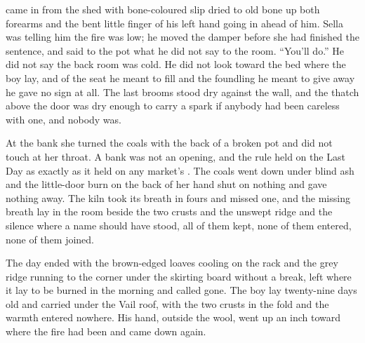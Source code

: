  came in from the shed with bone-coloured slip dried to old bone up both forearms and the bent little finger of his left hand going in ahead of him. Sella was telling him the fire was low; he moved the damper before she had finished the sentence, and said to the pot what he did not say to the room. “You'll do.” He did not say the back room was cold. He did not look toward the bed where the boy lay, and of the seat he meant to fill and the foundling he meant to give away he gave no sign at all. The last brooms stood dry against the wall, and the thatch above the door was dry enough to carry a spark if anybody had been careless with one, and nobody was.

At the bank she turned the coals with the back of a broken pot and did not touch  at her throat. A bank was not an opening, and the rule held on the Last Day as exactly as it held on any market's . The coals went down under blind ash and the little-door burn on the back of her hand shut on nothing and gave nothing away. The kiln took its breath in fours and missed one, and the missing breath lay in the room beside the two crusts and the unswept ridge and the silence where a name should have stood, all of them kept, none of them entered, none of them joined.

The day ended with the brown-edged loaves cooling on the rack and the grey ridge running to the corner under the skirting board without a break, left where it lay to be burned in the morning and called gone. The boy lay twenty-nine days old and carried under the Vail roof, with the two crusts in the fold and the warmth entered nowhere. His hand, outside the wool, went up an inch toward where the fire had been and came down again.
